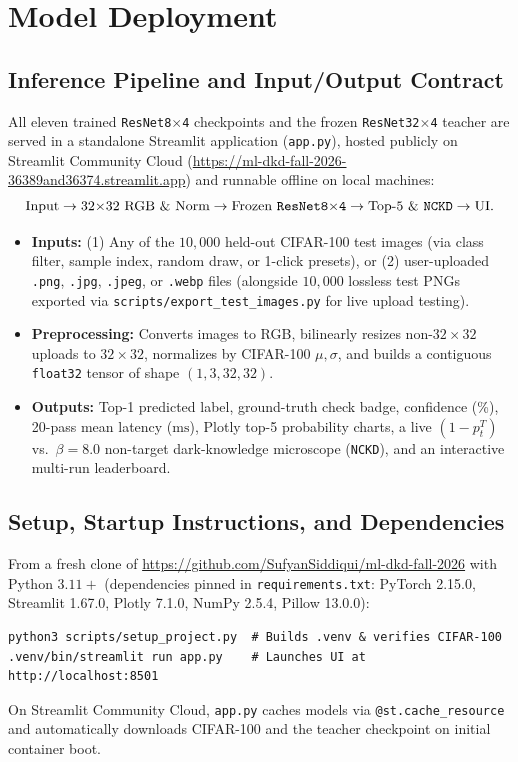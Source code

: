 \documentclass[11pt]{article}
\newcommand{\RepoURL}{https://github.com/SufyanSiddiqui/ml-dkd-fall-2026}
\newcommand{\LiveAppURL}{https://ml-dkd-fall-2026-36389and36374.streamlit.app}
\begin{document}
\section{Model Deployment}
\label{sec:deploy}

\subsection{Inference Pipeline and Input/Output Contract}

All eleven trained \texttt{ResNet8$\times$4} checkpoints and the frozen \texttt{ResNet32$\times$4} teacher are served in a standalone Streamlit application (\texttt{app.py}), hosted publicly on Streamlit Community Cloud (\url{\LiveAppURL}) and runnable offline on local machines:
\[
\text{Input} \rightarrow 32{\times}32\text{ RGB \& Norm} \rightarrow \text{Frozen \texttt{ResNet8$\times$4}} \rightarrow \text{Top-5 \& \texttt{NCKD}} \rightarrow \text{UI}.
\]
\begin{itemize}
    \item \textbf{Inputs:} (1) Any of the \(10{,}000\) held-out CIFAR-100 test images (via class filter, sample index, random draw, or 1-click presets), or (2) user-uploaded \texttt{.png}, \texttt{.jpg}, \texttt{.jpeg}, or \texttt{.webp} files (alongside \(10{,}000\) lossless test PNGs exported via \texttt{scripts/export\_test\_images.py} for live upload testing).
    \item \textbf{Preprocessing:} Converts images to RGB, bilinearly resizes non-\(32\times 32\) uploads to \(32 \times 32\), normalizes by CIFAR-100 \(\mu, \sigma\), and builds a contiguous \texttt{float32} tensor of shape \((1, 3, 32, 32)\).
    \item \textbf{Outputs:} Top-1 predicted label, ground-truth check badge, confidence (\%), 20-pass mean latency (\(\text{ms}\)), Plotly top-5 probability charts, a live \((1 - p_t^T)\) vs.\ \(\beta=8.0\) non-target dark-knowledge microscope (\texttt{NCKD}), and an interactive multi-run leaderboard.
\end{itemize}

\subsection{Setup, Startup Instructions, and Dependencies}

From a fresh clone of \url{\RepoURL} with Python \(3.11+\) (dependencies pinned in \texttt{requirements.txt}: PyTorch 2.15.0, Streamlit 1.67.0, Plotly 7.1.0, NumPy 2.5.4, Pillow 13.0.0):
\begin{verbatim}
python3 scripts/setup_project.py  # Builds .venv & verifies CIFAR-100
.venv/bin/streamlit run app.py    # Launches UI at http://localhost:8501
\end{verbatim}
On Streamlit Community Cloud, \texttt{app.py} caches models via \texttt{@st.cache\_resource} and automatically downloads CIFAR-100 and the teacher checkpoint on initial container boot.
\end{document}
